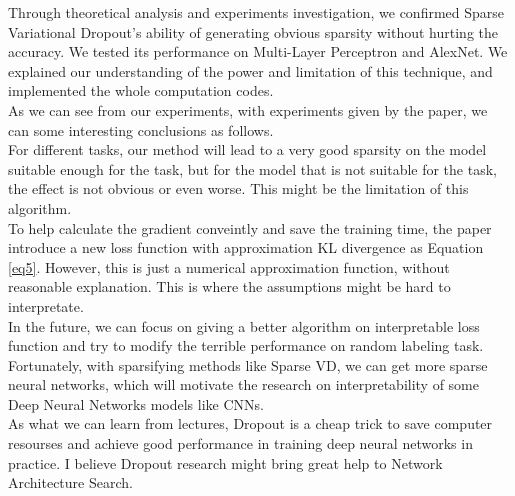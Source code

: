 \documentclass{article}
\begin{document}
	Through theoretical analysis and experiments investigation, we confirmed Sparse Variational Dropout's ability of generating obvious sparsity without hurting the accuracy. We tested its performance on Multi-Layer Perceptron and AlexNet. We explained our understanding of the power and limitation of this technique, and implemented the whole computation codes.\\
	As we can see from our experiments, with experiments given by the paper, we can some interesting conclusions as follows.\\
	For different tasks, our method will lead to a very good sparsity on the model suitable enough for the task, but for the model that is not suitable for the task, the effect is not obvious or even worse. This might be the limitation of this algorithm.\\
	To help calculate the gradient conveintly and save the training time, the paper introduce a new loss function with approximation KL divergence as Equation {\ref{eq5}}. However, this is just a numerical approximation function, without reasonable explanation. This is where the assumptions might be hard to interpretate.\\
	In the future, we can focus on giving a better algorithm on interpretable loss function and try to modify the terrible performance on random labeling task.\\
	Fortunately, with sparsifying methods like Sparse VD, we can get more sparse neural networks, which will motivate the research on interpretability of some Deep Neural Networks models like CNNs.\\
	As what we can learn from lectures, Dropout is a cheap trick to save computer resourses and achieve good performance in training deep neural networks in practice. I believe Dropout research might bring great help to Network Architecture Search.\\
\end{document}
